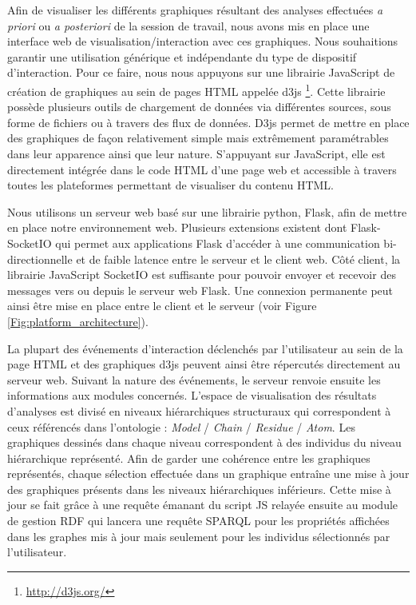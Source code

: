 Afin de visualiser les différents graphiques résultant des analyses effectuées \textit{a priori} ou \textit{a posteriori} de la session de travail, nous avons mis en place une interface web de visualisation/interaction avec ces graphiques. Nous souhaitions garantir une utilisation générique et indépendante du type de dispositif d'interaction. Pour ce faire, nous nous appuyons sur une librairie JavaScript de création de graphiques au sein de pages HTML appelée d3js \footnote{\url{http://d3js.org/}}. Cette librairie possède plusieurs outils de chargement de données via différentes sources, sous forme de fichiers ou à travers des flux de données. D3js permet de mettre en place des graphiques de façon relativement simple mais extrêmement paramétrables dans leur apparence ainsi que leur nature. S'appuyant sur JavaScript, elle est directement intégrée dans le code HTML d'une page web et accessible à travers toutes les plateformes permettant de visualiser du contenu HTML.

Nous utilisons un serveur web basé sur une librairie python, Flask, afin de mettre en place notre environnement web. Plusieurs extensions existent dont Flask-SocketIO qui permet aux applications Flask d'accéder à une communication bi-directionnelle et de faible latence entre le serveur et le client web. Côté client, la librairie JavaScript SocketIO est suffisante pour pouvoir envoyer et recevoir des messages vers ou depuis le serveur web Flask. Une connexion permanente peut ainsi être mise en place entre le client et le serveur (voir Figure \ref{Fig:platform_architecture}).

La plupart des événements d'interaction déclenchés par l'utilisateur au sein de la page HTML et des graphiques d3js peuvent ainsi être répercutés directement au serveur web. Suivant la nature des événements, le serveur renvoie ensuite les informations aux modules concernés.
L'espace de visualisation des résultats d'analyses est divisé en niveaux hiérarchiques structuraux qui correspondent à ceux référencés dans l'ontologie : \textit{Model} / \textit{Chain} / \textit{Residue} / \textit{Atom}. Les graphiques dessinés dans chaque niveau correspondent à des individus du niveau hiérarchique représenté. Afin de garder une cohérence entre les graphiques représentés, chaque sélection effectuée dans un graphique entraîne une mise à jour des graphiques présents dans les niveaux hiérarchiques inférieurs. Cette mise à jour se fait grâce à une requête émanant du script JS relayée ensuite au module de gestion RDF qui lancera une requête SPARQL pour les propriétés affichées dans les graphes mis à jour mais seulement pour les individus sélectionnés par l'utilisateur.

